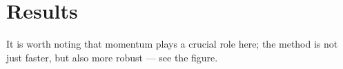 \section{Results}\label{sec:results}
It is worth noting that momentum plays a crucial role here; the method is not just faster, but also
more robust --- see the figure.
